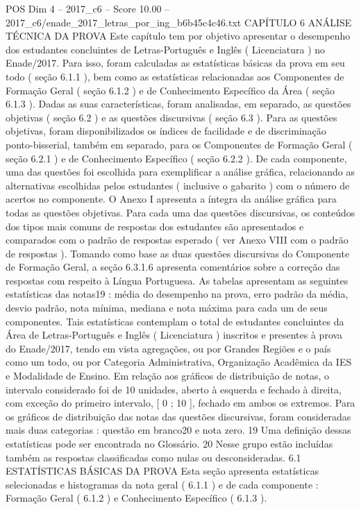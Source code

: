 \begin{textsample}{POS Dim 4 – 2017\_c6 – Score 10.00 – 2017\_c6/enade\_2017\_letras\_por\_ing\_b6b45c4c46.txt}  \label{ex:f4_pos_039}
CAPÍTULO 6 ANÁLISE TÉCNICA DA PROVA Este capítulo tem por objetivo apresentar o desempenho dos estudantes concluintes de Letras-Português e Inglês ( Licenciatura ) no Enade/2017.
Para isso, foram calculadas as estatísticas básicas da prova em seu todo ( seção 6.1.1 ), bem como as estatísticas relacionadas aos Componentes de Formação Geral ( seção 6.1.2 ) e de Conhecimento Específico da Área ( seção 6.1.3 ).
Dadas as suas características, foram analisadas, em separado, as questões objetivas ( seção 6.2 ) e as questões discursivas ( seção 6.3 ).
Para as questões objetivas, foram disponibilizados os índices de facilidade e de discriminação ponto-bisserial, também em separado, para os Componentes de Formação Geral ( seção 6.2.1 ) e de Conhecimento Específico ( seção 6.2.2 ).
De cada componente, uma das questões foi escolhida para exemplificar a análise gráfica, relacionando as alternativas escolhidas pelos estudantes ( inclusive o gabarito ) com o número de acertos no componente.
O Anexo I apresenta a íntegra da análise gráfica para todas as questões objetivas.
Para cada uma das questões discursivas, os conteúdos dos tipos mais comuns de respostas dos estudantes são apresentados e comparados com o padrão de respostas esperado ( ver Anexo VIII com o padrão de respostas ).
Tomando como base as duas questões discursivas do Componente de Formação Geral, a seção 6.3.1.6 apresenta comentários sobre a correção das respostas com respeito à Língua Portuguesa.
As tabelas apresentam as seguintes estatísticas das notas19 : média do desempenho na prova, erro padrão da média, desvio padrão, nota mínima, mediana e nota máxima para cada um de seus componentes.
Tais estatísticas contemplam o total de estudantes concluintes da Área de Letras-Português e Inglês ( Licenciatura ) inscritos e presentes à prova do Enade/2017, tendo em vista agregações, ou por Grandes Regiões e o país como um todo, ou por Categoria Administrativa, Organização Acadêmica da IES e Modalidade de Ensino.
Em relação aos gráficos de distribuição de notas, o intervalo considerado foi de 10 unidades, aberto à esquerda e fechado à direita, com exceção do primeiro intervalo, [ 0 ; 10 ], fechado em ambos os extremos.
Para os gráficos de distribuição das notas das questões discursivas, foram consideradas mais duas categorias : questão em branco20 e nota zero. 19 Uma definição dessas estatísticas pode ser encontrada no Glossário. 20 Nesse grupo estão incluídas também as respostas classificadas como nulas ou desconsideradas. 6.1 ESTATÍSTICAS BÁSICAS DA PROVA Esta seção apresenta estatísticas selecionadas e histogramas da nota geral ( 6.1.1 ) e de cada componente : Formação Geral ( 6.1.2 ) e Conhecimento Específico ( 6.1.3 ).

\end{textsample}
